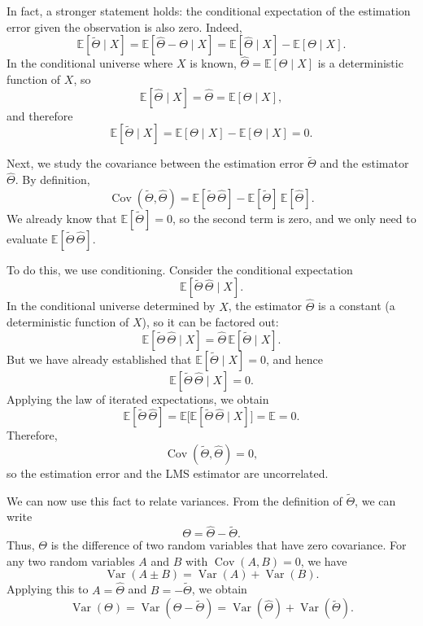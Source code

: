 In fact, a stronger statement holds: the conditional expectation of the estimation error given the observation is also zero.  
Indeed,
\[
\mathbb{E}[\tilde{\Theta} \mid X]
=
\mathbb{E}[\hat{\Theta} - \Theta \mid X]
=
\mathbb{E}[\hat{\Theta} \mid X]
-
\mathbb{E}[\Theta \mid X].
\]
In the conditional universe where \(X\) is known, \(\hat{\Theta} = \mathbb{E}[\Theta \mid X]\) is a deterministic function of \(X\), so
\[
\mathbb{E}[\hat{\Theta} \mid X]
=
\hat{\Theta}
=
\mathbb{E}[\Theta \mid X],
\]
and therefore
\[
\mathbb{E}[\tilde{\Theta} \mid X]
=
\mathbb{E}[\Theta \mid X]
-
\mathbb{E}[\Theta \mid X]
=
0.
\]

Next, we study the covariance between the estimation error \(\tilde{\Theta}\) and the estimator \(\hat{\Theta}\).  
By definition,
\[
\operatorname{Cov}(\tilde{\Theta},\hat{\Theta})
=
\mathbb{E}[\tilde{\Theta}\,\hat{\Theta}]
-
\mathbb{E}[\tilde{\Theta}]\,\mathbb{E}[\hat{\Theta}].
\]
We already know that \(\mathbb{E}[\tilde{\Theta}] = 0\), so the second term is zero, and we only need to evaluate \(\mathbb{E}[\tilde{\Theta}\,\hat{\Theta}]\).

To do this, we use conditioning.  
Consider the conditional expectation
\[
\mathbb{E}[\tilde{\Theta}\,\hat{\Theta} \mid X].
\]
In the conditional universe determined by \(X\), the estimator \(\hat{\Theta}\) is a constant (a deterministic function of \(X\)), so it can be factored out:
\[
\mathbb{E}[\tilde{\Theta}\,\hat{\Theta} \mid X]
=
\hat{\Theta}\,\mathbb{E}[\tilde{\Theta} \mid X].
\]
But we have already established that \(\mathbb{E}[\tilde{\Theta} \mid X] = 0\), and hence
\[
\mathbb{E}[\tilde{\Theta}\,\hat{\Theta} \mid X]
=
0.
\]
Applying the law of iterated expectations, we obtain
\[
\mathbb{E}[\tilde{\Theta}\,\hat{\Theta}]
=
\mathbb{E}\big[\mathbb{E}[\tilde{\Theta}\,\hat{\Theta} \mid X]\big]
=
\mathbb{E}
=
0.
\]
Therefore,
\[
\operatorname{Cov}(\tilde{\Theta},\hat{\Theta})
=
0,
\]
so the estimation error and the LMS estimator are uncorrelated.

We can now use this fact to relate variances.  
From the definition of \(\tilde{\Theta}\), we can write
\[
\Theta
=
\hat{\Theta} - \tilde{\Theta}.
\]
Thus, \(\Theta\) is the difference of two random variables that have zero covariance.  
For any two random variables \(A\) and \(B\) with \(\operatorname{Cov}(A,B) = 0\), we have
\[
\operatorname{Var}(A \pm B)
=
\operatorname{Var}(A) + \operatorname{Var}(B).
\]
Applying this to \(A = \hat{\Theta}\) and \(B = -\tilde{\Theta}\), we obtain
\[
\operatorname{Var}(\Theta)
=
\operatorname{Var}(\hat{\Theta} - \tilde{\Theta})
=
\operatorname{Var}(\hat{\Theta})
+
\operatorname{Var}(\tilde{\Theta}).
\]

